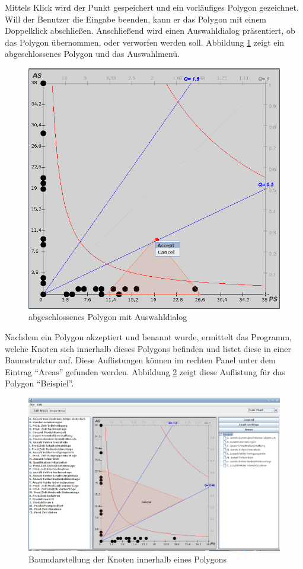 Mittels Klick wird der Punkt gespeichert und ein vorläufiges Polygon gezeichnet. Will der Benutzer die Eingabe beenden, kann er das Polygon mit einem Doppelklick abschließen. Anschließend wird einen Auswahldialog präsentiert, ob das Polygon übernommen, oder verworfen werden soll.
Abbildung \ref{menü} zeigt ein abgeschlossenes Polygon und das Auswahlmenü.
\begin{figure}
	\centering
	\includegraphics[width=1\textwidth]{pictures/menu.png}
	\caption{abgeschlossenes Polygon mit Auswahldialog}
	\label{menü}
\end{figure}

Nachdem ein Polygon akzeptiert und benannt wurde, ermittelt das Programm, welche Knoten sich innerhalb dieses Polygons befinden und listet diese in einer Baumstruktur auf. Diese Auflistungen können im rechten Panel unter dem Eintrag ``Areas'' gefunden werden. Abbildung \ref{baum} zeigt diese Auflistung für das Polygon ``Beispiel''.
\begin{figure}
	\centering
	\includegraphics[width=1\textwidth]{pictures/baum.png}
	\caption{Baumdarstellung der Knoten innerhalb eines Polygons}
	\label{baum}
\end{figure}

